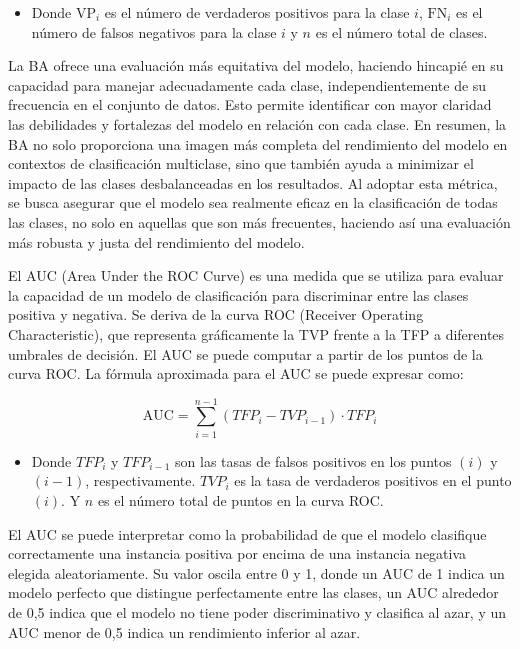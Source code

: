 \begin{itemize}
    \item Donde $\text{VP}_i$ es el número de verdaderos positivos para la clase $i$, $\text{FN}_i$ es el número de falsos negativos para la clase $i$ y $n$ es el número total de clases.
\end{itemize}


La BA ofrece una evaluación más equitativa del modelo, haciendo hincapié en su capacidad para manejar adecuadamente cada clase, independientemente de su frecuencia en el conjunto de datos. Esto permite identificar con mayor claridad las debilidades y fortalezas del modelo en relación con cada clase. En resumen, la BA no solo proporciona una imagen más completa del rendimiento del modelo en contextos de clasificación multiclase, sino que también ayuda a minimizar el impacto de las clases desbalanceadas en los resultados. Al adoptar esta métrica, se busca asegurar que el modelo sea realmente eficaz en la clasificación de todas las clases, no solo en aquellas que son más frecuentes, haciendo así una evaluación más robusta y justa del rendimiento del modelo.

El AUC (Area Under the ROC Curve) es una medida que se utiliza para evaluar la capacidad de un modelo de clasificación para discriminar entre las clases positiva y negativa. Se deriva de la curva ROC (Receiver Operating Characteristic), que representa gráficamente la TVP frente a la TFP a diferentes umbrales de decisión. El AUC se puede computar a partir de los puntos de la curva ROC. La fórmula aproximada para el AUC se puede expresar como:

\begin{equation}
    \text{AUC} = \sum_{i=1}^{n-1} \left( TFP_i - TVP_{i-1} \right) \cdot TFP_i
\end{equation}

\begin{itemize}
    \item Donde $TFP_i$ y $TFP_{i-1}$ son las tasas de falsos positivos en los puntos $(i)$ y $(i-1)$, respectivamente. $TVP_i$ es la tasa de verdaderos positivos en el punto $(i)$. Y $n$ es el número total de puntos en la curva ROC.
\end{itemize}

El AUC se puede interpretar como la probabilidad de que el modelo clasifique correctamente una instancia positiva por encima de una instancia negativa elegida aleatoriamente. Su valor oscila entre 0 y 1, donde un AUC de 1 indica un modelo perfecto que distingue perfectamente entre las clases, un AUC alrededor de 0,5 indica que el modelo no tiene poder discriminativo y clasifica al azar, y un AUC menor de 0,5 indica un rendimiento inferior al azar.

